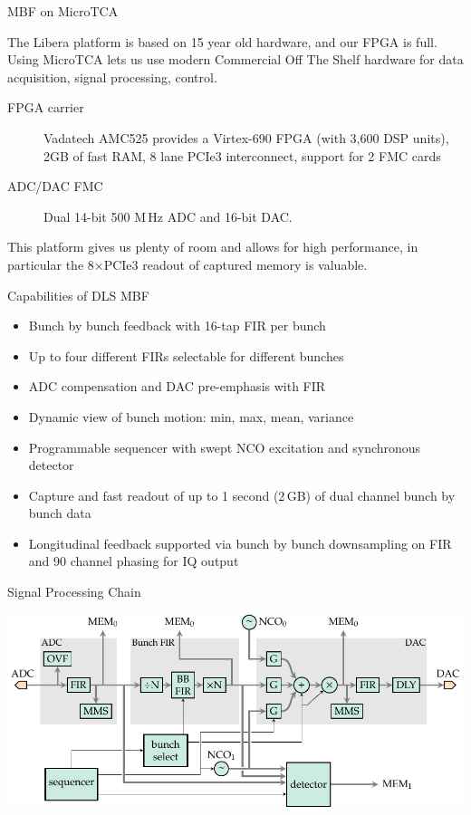 \documentclass[xcolor=table]{beamer}
\begin{document}
%
\begin{frame}{MBF on MicroTCA}

The Libera platform is based on 15 year old hardware, and our FPGA is full.
Using MicroTCA lets us use modern Commercial Off The Shelf hardware for data
acquisition, signal processing, control.

\begin{description}
\item[FPGA carrier]
    Vadatech AMC525 provides a Virtex-690 FPGA (with 3,600 DSP units), 2GB of
    fast RAM, 8 lane PCIe3 interconnect, support for 2 FMC cards
\item[ADC/DAC FMC]
    Dual 14-bit 500 M\,Hz ADC and 16-bit DAC.
\end{description}

This platform gives us plenty of room and allows for high performance, in
particular the 8$\times$PCIe3 readout of captured memory is valuable.

\end{frame}


%
\begin{frame}{Capabilities of DLS MBF}

\begin{itemize}
\item Bunch by bunch feedback with 16-tap FIR per bunch
\item Up to four different FIRs selectable for different bunches
\item ADC compensation and DAC pre-emphasis with FIR
\item Dynamic view of bunch motion: min, max, mean, variance
\item Programmable sequencer with swept NCO excitation and synchronous detector
\item Capture and fast readout of up to 1 second (2\,GB) of dual channel bunch
    by bunch data
\item Longitudinal feedback supported via bunch by bunch downsampling on FIR and
    90\textdegree{} channel phasing for IQ output
\end{itemize}

\end{frame}


%
\begin{frame}{Signal Processing Chain}

\includegraphics[width=\linewidth]{processing.pdf}

\end{frame}
\end{document}
